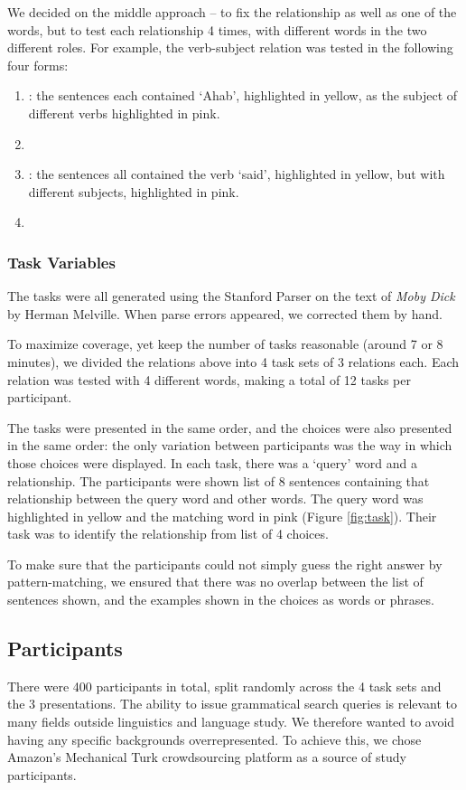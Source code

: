 We decided on the middle approach -- to fix the relationship as well as one of the words, but to test each relationship 4 times, with different words in the two different roles. For example, the verb-subject relation  was tested in the following four forms:
\begin{enumerate}
	\item {}:  the sentences each contained `Ahab', highlighted in yellow, as the subject of different verbs highlighted in pink.
	\item {}

	\item {}: the sentences all contained the verb `said', highlighted in yellow, but with different subjects, highlighted in pink.
	\item {}
\end{enumerate}

\subsubsection{Task Variables}

The tasks were all generated using the Stanford Parser on the text of \emph{Moby Dick} by Herman Melville. When parse errors appeared, we corrected them by hand.

To maximize coverage, yet keep the number of tasks reasonable (around 7 or 8 minutes), we divided the relations above into 4 task sets of 3 relations each. Each relation was tested with 4 different words, making a total of 12 tasks per participant.

The tasks were presented in the same order, and the choices were also presented in the same order: the only variation between participants was the way in which those choices were displayed. In each task, there was a `query' word and a relationship. The participants were shown list of 8 sentences containing that relationship between the query word and other words. The query word was highlighted in yellow and the matching word in pink (Figure \ref{fig:task}). Their task was to identify the relationship from list of 4 choices.

To make sure that the participants could not simply guess the right answer by pattern-matching, we ensured that there was no overlap between the list of sentences shown, and the examples shown in the choices as words or phrases.


\subsection{Participants}
There were 400 participants in total, split randomly across the 4 task sets and the 3 presentations. The ability to issue grammatical search queries is relevant to many fields outside linguistics and language study. We therefore wanted to avoid having any specific backgrounds overrepresented. To achieve this, we chose Amazon's Mechanical Turk crowdsourcing platform as a source of study participants.

